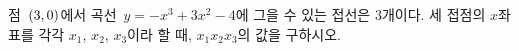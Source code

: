 점~$(3{,}\mkern3mu\mathopen{}0)$에서 곡선~$y=-x^3+3x^2-4$에 그을 수 있는 접선은 $3$개이다. 세 접점의 $x$좌표를 각각 $x_1$, $x_2$, $x_3$이라 할 때, $x_1x_2x_3$의 값을 구하시오.
